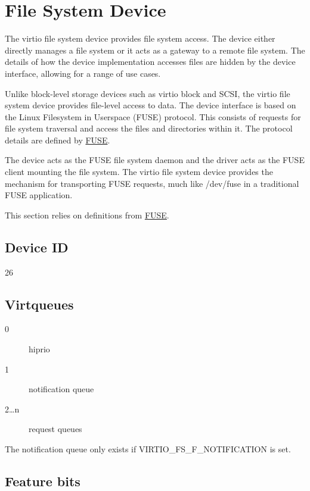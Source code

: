 \section{File System Device}\label{sec:Device Types / File System Device}

The virtio file system device provides file system access.  The device either
directly manages a file system or it acts as a gateway to a remote file system.
The details of how the device implementation accesses files are hidden by the
device interface, allowing for a range of use cases.

Unlike block-level storage devices such as virtio block and SCSI, the virtio
file system device provides file-level access to data.  The device interface is
based on the Linux Filesystem in Userspace (FUSE) protocol.  This consists of
requests for file system traversal and access the files and directories within
it.  The protocol details are defined by \hyperref[intro:FUSE]{FUSE}.

The device acts as the FUSE file system daemon and the driver acts as the FUSE
client mounting the file system.  The virtio file system device provides the
mechanism for transporting FUSE requests, much like /dev/fuse in a traditional
FUSE application.

This section relies on definitions from \hyperref[intro:FUSE]{FUSE}.

\subsection{Device ID}\label{sec:Device Types / File System Device / Device ID}
  26

\subsection{Virtqueues}\label{sec:Device Types / File System Device / Virtqueues}

\begin{description}
\item[0] hiprio
\item[1] notification queue
\item[2\ldots n] request queues
\end{description}

The notification queue only exists if VIRTIO_FS_F_NOTIFICATION is set.

\subsection{Feature bits}\label{sec:Device Types / File System Device / Feature bits}

